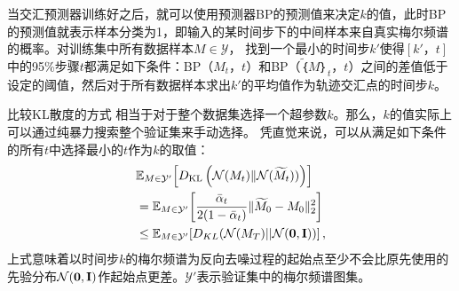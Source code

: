 当交汇预测器训练好之后，就可以使用预测器BP的预测值来决定$k$的值，此时BP的预测值就表示样本分类为1，即输入的某时间步下的中间样本来自真实梅尔频谱的概率。对训练集中所有数据样本$ M \in \mathcal{Y}$，
找到一个最小的时间步$k'$使得$[k'，t]$中的95\%步骤$t$都满足如下条件：BP（$M_t$，$t$）和BP（$\widetilde｛M｝_t$，$t$）之间的差值低于设定的阈值，然后对于所有数据样本求出$k'$的平均值作为轨迹交汇点的时间步$k$。

比较KL散度的方式
相当于对于整个数据集选择一个超参数$k$。那么，$k$的值实际上可以通过纯暴力搜索整个验证集来手动选择。
凭直觉来说，可以从满足如下条件的所有$t$中选择最小的$t$作为$k$的取值：
\begin{align}
    &\mathbb{E}_{M\in \mathcal{Y'}}\!\left[D_{\mathrm{KL}}\left(\mathcal{N}(M_t)  \| \mathcal{N}(\widetilde{M}_t))\right)\right] \\
    &=  \mathbb{E}_{M\in \mathcal{Y'}}\!\left[\frac{\bar\alpha_t}{2(1-\bar\alpha_t)} \|\widetilde{M}_0-M_0 \| _2^2\right]\\ &\leq \mathbb{E}_{M\in \mathcal{Y'}}\!\left[D_{KL}(\mathcal{N}(M_T) || \mathcal{N}(\mathbf{0}, \mathbf{I}))\right],
\end{align}
上式意味着以时间步$k$的梅尔频谱为反向去噪过程的起始点至少不会比原先使用的先验分布$\mathcal{N}(\mathbf{0}, \mathbf{I})$作起始点更差。$\mathcal{Y'}$表示验证集中的梅尔频谱图集。
